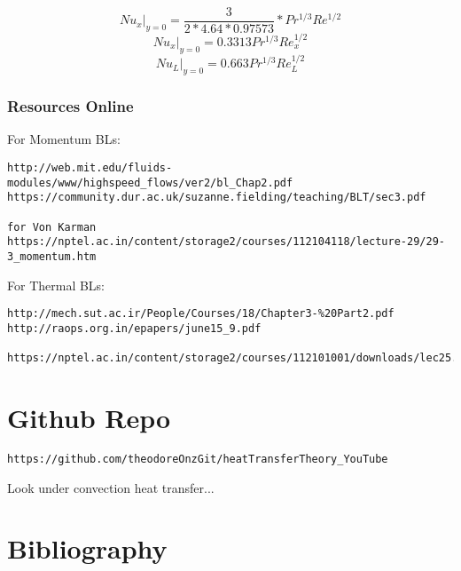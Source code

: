 \documentclass[11pt]{article}
\begin{document}
$$Nu_x |_{y=0} = \frac{3}{2 *4.64 *0.97573} * Pr^{1/3} Re^{1/2}$$
$$Nu_x |_{y=0} = 0.3313 Pr^{1/3} Re_x^{1/2}$$
$$Nu_L |_{y=0} = 0.663 Pr^{1/3} Re_L^{1/2}$$


\section{Resources Online}

For Momentum BLs:
\begin{verbatim}
http://web.mit.edu/fluids-modules/www/highspeed_flows/ver2/bl_Chap2.pdf
https://community.dur.ac.uk/suzanne.fielding/teaching/BLT/sec3.pdf

for Von Karman
https://nptel.ac.in/content/storage2/courses/112104118/lecture-29/29-3_momentum.htm
\end{verbatim}

For Thermal BLs:

\begin{verbatim}
http://mech.sut.ac.ir/People/Courses/18/Chapter3-%20Part2.pdf
http://raops.org.in/epapers/june15_9.pdf

https://nptel.ac.in/content/storage2/courses/112101001/downloads/lec25.pdf
\end{verbatim}

\part{Github Repo}
\begin{verbatim}
https://github.com/theodoreOnzGit/heatTransferTheory_YouTube
\end{verbatim}

Look under convection heat transfer...


\part{Bibliography}

\printbibliography
\end{document}
